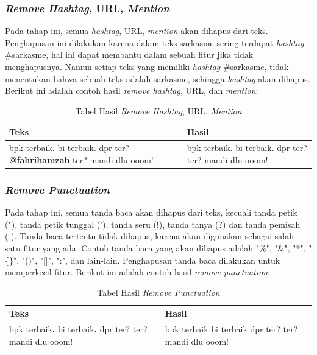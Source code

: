 \subsubsection{\textit{Remove Hashtag}, URL, \textit{Mention}}
Pada tahap ini, semua \textit{hashtag}, URL, \textit{mention} akan dihapus dari teks. Penghapusan ini dilakukan karena dalam teks sarkasme sering terdapat \textit{hashtag} \#sarkasme, hal ini dapat membantu dalam sebuah fitur jika tidak menghapusnya. Namun setiap teks yang memiliki \textit{hashtag} \#sarkasme, tidak menentukan bahwa sebuah 
teks adalah sarkasme, sehingga \textit{hashtag} akan dihapus. Berikut ini adalah contoh hasil \textit{remove hashtag}, URL, dan \textit{mention}:
\begin{table}[H]
	\caption{Tabel Hasil \textit{Remove Hashtag}, URL, \textit{Mention}}
	\centering
	\small
	\begin{adjustbox}{width=1\textwidth}
	\begin{tabular}{|p{6.50cm}|p{6.50cm}|}
		\hline
		\textbf{Teks} & \textbf{Hasil} \\
		\hline
		bpk terbaik. bi terbaik. dpr ter? \textbf{@fahrihamzah} ter? mandi dlu ooom! & bpk terbaik. bi terbaik. dpr ter? ter? mandi dlu ooom! \\
		\hline
	\end{tabular}
	\end{adjustbox}
\end{table}
\subsubsection{\textit{Remove Punctuation}}
Pada tahap ini, semua tanda baca akan dihapus dari teks, kecuali tanda petik ("), tanda petik tunggal ('), tanda seru (!), tanda tanya (?) dan tanda pemisah (-). Tanda baca tertentu tidak dihapus, karena akan digunakan sebagai salah satu fitur yang ada. Contoh tanda baca yang akan dihapus adalah "\%", "\&", "*", "\{\}", "()", "[]", ":", dan lain-lain. Penghapusan tanda baca dilakukan untuk memperkecil fitur. Berikut ini adalah contoh hasil \textit{remove punctuation}:
\begin{table}[H]
	\caption{Tabel Hasil \textit{Remove Punctuation}}
	\centering
	\small
	\begin{adjustbox}{width=1\textwidth}
	\begin{tabular}{|p{6.50cm}|p{6.50cm}|}
		\hline
		\textbf{Teks} & \textbf{Hasil} \\
		\hline
		bpk terbaik\textbf{.} bi terbaik\textbf{.} dpr ter? ter? mandi dlu ooom! & bpk terbaik bi terbaik dpr ter? ter? mandi dlu ooom! \\
		\hline
	\end{tabular}
	\end{adjustbox}
\end{table}

